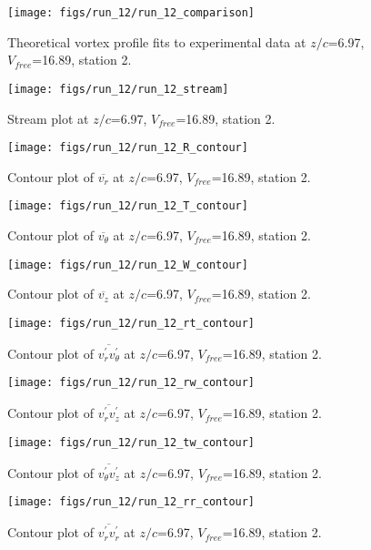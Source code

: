 \begin{figure}[H]
\centering
\texttt{[image: figs/run\_12/run\_12\_comparison]}
\caption{Theoretical vortex profile fits to experimental data at $z/c$=6.97, $V_{free}$=16.89, station 2.}
\end{figure}


\begin{figure}[H]
\centering
\texttt{[image: figs/run\_12/run\_12\_stream]}
\caption{Stream plot at $z/c$=6.97, $V_{free}$=16.89, station 2.}
\end{figure}


\begin{figure}[H]
\centering
\texttt{[image: figs/run\_12/run\_12\_R\_contour]}
\caption{Contour plot of $\overline{v_{r}}$ at $z/c$=6.97, $V_{free}$=16.89, station 2.}
\end{figure}


\begin{figure}[H]
\centering
\texttt{[image: figs/run\_12/run\_12\_T\_contour]}
\caption{Contour plot of $\overline{v_{\theta}}$ at $z/c$=6.97, $V_{free}$=16.89, station 2.}
\end{figure}


\begin{figure}[H]
\centering
\texttt{[image: figs/run\_12/run\_12\_W\_contour]}
\caption{Contour plot of $\overline{v_{z}}$ at $z/c$=6.97, $V_{free}$=16.89, station 2.}
\end{figure}


\begin{figure}[H]
\centering
\texttt{[image: figs/run\_12/run\_12\_rt\_contour]}
\caption{Contour plot of $\overline{v_{r}^{\prime} v_{\theta}^{\prime}}$ at $z/c$=6.97, $V_{free}$=16.89, station 2.}
\end{figure}


\begin{figure}[H]
\centering
\texttt{[image: figs/run\_12/run\_12\_rw\_contour]}
\caption{Contour plot of $\overline{v_{r}^{\prime} v_{z}^{\prime}}$ at $z/c$=6.97, $V_{free}$=16.89, station 2.}
\end{figure}


\begin{figure}[H]
\centering
\texttt{[image: figs/run\_12/run\_12\_tw\_contour]}
\caption{Contour plot of $\overline{v_{\theta}^{\prime} v_{z}^{\prime}}$ at $z/c$=6.97, $V_{free}$=16.89, station 2.}
\end{figure}


\begin{figure}[H]
\centering
\texttt{[image: figs/run\_12/run\_12\_rr\_contour]}
\caption{Contour plot of $\overline{v_{r}^{\prime} v_{r}^{\prime}}$ at $z/c$=6.97, $V_{free}$=16.89, station 2.}
\end{figure}


